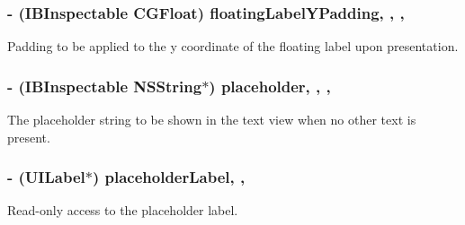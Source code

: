 \subsubsection[{floating\+Label\+Y\+Padding}]{\setlength{\rightskip}{0pt plus 5cm}-\/ (I\+B\+Inspectable C\+G\+Float) floating\+Label\+Y\+Padding\hspace{0.3cm}{\ttfamily [read]}, {\ttfamily [write]}, {\ttfamily [nonatomic]}, {\ttfamily [assign]}}\label{interface_j_v_float_labeled_text_view_a407df8e8312fa50a95182e1b69360257}
Padding to be applied to the y coordinate of the floating label upon presentation. \hypertarget{interface_j_v_float_labeled_text_view_a8abe506cc556e72fb0e77cc884f7192d}{}
\subsubsection[{placeholder}]{\setlength{\rightskip}{0pt plus 5cm}-\/ (I\+B\+Inspectable N\+S\+String$\ast$) placeholder\hspace{0.3cm}{\ttfamily [read]}, {\ttfamily [write]}, {\ttfamily [nonatomic]}, {\ttfamily [copy]}}\label{interface_j_v_float_labeled_text_view_a8abe506cc556e72fb0e77cc884f7192d}
The placeholder string to be shown in the text view when no other text is present. \hypertarget{interface_j_v_float_labeled_text_view_ab90f8f526a28fcae4d4a1c264826cb4d}{}
\subsubsection[{placeholder\+Label}]{\setlength{\rightskip}{0pt plus 5cm}-\/ (U\+I\+Label$\ast$) placeholder\+Label\hspace{0.3cm}{\ttfamily [read]}, {\ttfamily [nonatomic]}, {\ttfamily [strong]}}\label{interface_j_v_float_labeled_text_view_ab90f8f526a28fcae4d4a1c264826cb4d}
Read-\/only access to the placeholder label. \hypertarget{interface_j_v_float_labeled_text_view_ada674f4ce304734239a459d1d2c822f1}{}
